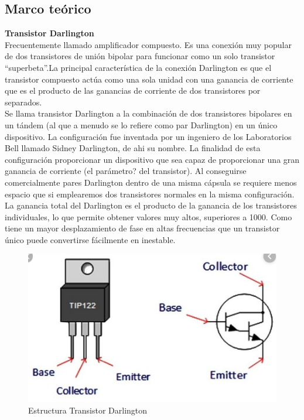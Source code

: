 \documentclass[10pt,a4paper]{article}
\begin{document}
\subsection*{Marco teórico}
\textbf{Transistor Darlington}\\
Frecuentemente llamado amplificador compuesto. Es una conexión muy popular de dos transistores de unión bipolar para funcionar como un solo transistor “superbeta”.La principal característica de la conexión Darlington es que el transistor compuesto actúa como una sola unidad con una ganancia de corriente que es el producto de las ganancias de corriente de dos transistores por separados.\\
Se llama transistor Darlington a la combinación de dos transistores bipolares en un tándem (al que a menudo se lo refiere como par Darlington) en un único dispositivo. La configuración fue inventada por un ingeniero de los Laboratorios Bell llamado Sidney Darlington, de ahi su nombre. La finalidad de esta configuración proporcionar un dispositivo que sea capaz de proporcionar una gran ganancia de corriente (el parámetro? del transistor). Al conseguirse comercialmente pares Darlington dentro de una misma cápsula se requiere menos espacio que si emplearemos dos transistores normales en la misma configuración.\\
La ganancia total del Darlington es el producto de la ganancia de los transistores individuales, lo que permite obtener valores muy altos, superiores a 1000. Como tiene un mayor desplazamiento de fase en altas frecuencias que un transistor único puede convertirse fácilmente en inestable.\\
\begin{figure}[hbtp]
\centering
\includegraphics[scale=0.5]{Pictures/Darlington.PNG}
\caption{Estructura Transistor Darlington }
\end{figure}
\end{document}
